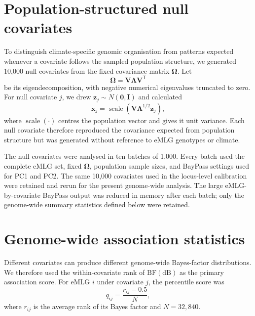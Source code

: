 \documentclass[11pt,a4paper]{article}
\begin{document}
\section{Population-structured null covariates}

To distinguish climate-specific genomic organisation from patterns expected whenever a covariate follows the sampled population structure, we generated 10,000 null covariates from the fixed covariance matrix $\boldsymbol{\Omega}$. Let
\begin{equation}
  \boldsymbol{\Omega}=\mathbf{V}\boldsymbol{\Lambda}\mathbf{V}^{\mathsf{T}}
\end{equation}
be its eigendecomposition, with negative numerical eigenvalues truncated to zero. For null covariate $j$, we drew $\mathbf{z}_j\sim N(\mathbf{0},\mathbf{I})$ and calculated
\begin{equation}
  \mathbf{x}_j =
  \operatorname{scale}\!\left(
  \mathbf{V}\boldsymbol{\Lambda}^{1/2}\mathbf{z}_j
  \right),
\end{equation}
where $\operatorname{scale}(\cdot)$ centres the population vector and gives it unit variance. Each null covariate therefore reproduced the covariance expected from population structure but was generated without reference to eMLG genotypes or climate.

The null covariates were analysed in ten batches of 1,000. Every batch used the complete eMLG set, fixed $\boldsymbol{\Omega}$, population sample sizes, and BayPass settings used for PC1 and PC2. The same 10,000 covariates used in the locus-level calibration were retained and rerun for the present genome-wide analysis. The large eMLG-by-covariate BayPass output was reduced in memory after each batch; only the genome-wide summary statistics defined below were retained.

\section{Genome-wide association statistics}

Different covariates can produce different genome-wide Bayes-factor distributions. We therefore used the within-covariate rank of $\mathrm{BF(dB)}$ as the primary association score. For eMLG $i$ under covariate $j$, the percentile score was
\begin{equation}
  q_{ij}=\frac{r_{ij}-0.5}{N},
\end{equation}
where $r_{ij}$ is the average rank of its Bayes factor and $N=32{,}840$.
\end{document}
